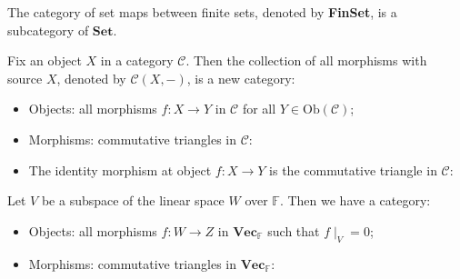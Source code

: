 \documentclass[
	11pt, %
	fleqn, %
	a4paper, %
]{LegrandOrangeBook}
\newcommand{\F}{\mathbb{F}} %
\newcommand{\C}{\mathcal{C}} %
\newcommand{\Set}{\textbf{Set}} %
\newcommand{\Vect}{\textbf{Vec}} %
\newcommand{\Ob}[1]{\text{Ob}(#1)} %
\begin{document}
\begin{example}
    The category of set maps between finite sets, denoted by \textbf{FinSet}, is a subcategory of $\Set$.
\end{example}

\begin{example}
    Fix an object $X$ in a category $\C$. Then the collection of all morphisms with source $X$, denoted by $\C(X, -)$, is a new category:
    \begin{itemize}
        \item Objects: all morphisms $f : X \to Y$ in $\C$ for all $Y \in \Ob{\C}$;
        \item Morphisms: commutative triangles in $\C$:
        \begin{center}
        \end{center}
        \item The identity morphism at object $f : X \to Y$ is the commutative triangle in $\C$:
        \begin{center}
        \end{center}
    \end{itemize} 
\end{example}

\begin{example}
    Let $V$ be a subspace of the linear space $W$ over $\F$. Then we have a category:
    \begin{itemize}
        \item Objects: all morphisms $f : W \to Z$ in $\Vect_{\F}$ such that $f\mid_V = 0$;
        \item Morphisms: commutative triangles in $\Vect_{\F}$:
        \begin{center}
        \end{center}
    \end{itemize}
\end{example}
\end{document}
